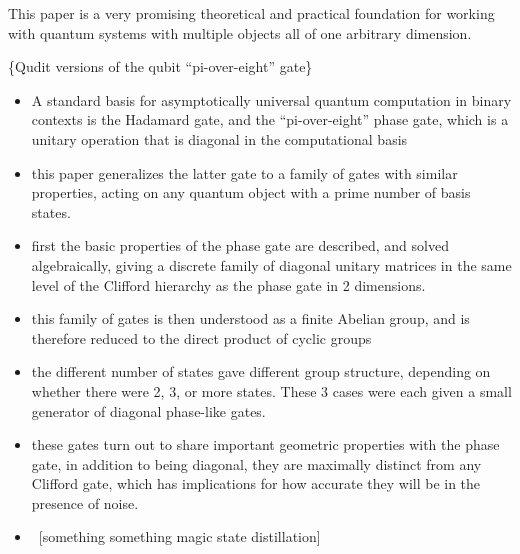 This paper is a very promising theoretical and practical foundation for working with quantum systems with multiple objects all of one arbitrary dimension.

\{Qudit versions of the qubit ``pi-over-eight'' gate\}
\begin{itemize}
	\item A standard basis for asymptotically universal quantum computation in binary contexts is the Hadamard gate, and the ``pi-over-eight'' phase gate, which is a unitary operation that is diagonal in the computational basis
	\item this paper generalizes the latter gate to a family of gates with similar properties, acting on any quantum object with a prime number of basis states.
	\item first the basic properties of the phase gate are described, and solved algebraically, giving a discrete family of diagonal unitary matrices in the same level of the Clifford hierarchy as the phase gate in 2 dimensions.
	\item this family of gates is then understood as a finite Abelian group, and is therefore reduced to the direct product of cyclic groups
	\item the different number of states gave different group structure, depending on whether there were 2, 3, or more states. These 3 cases were each given a small generator of diagonal phase-like gates.
	\item these gates turn out to share important geometric properties with the phase gate, in addition to being diagonal, they are maximally distinct from any Clifford gate, which has implications for how accurate they will be in the presence of noise.
	\item \ [something something magic state distillation]
\end{itemize}

